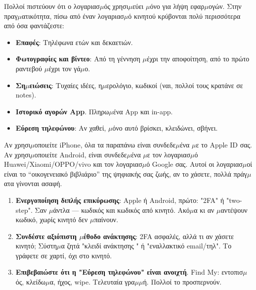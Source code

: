 


Πολλοί πιστεύουν ότι ο λογαριασ$\mu$ός χρησι$\mu$εύει $\mu$όνο για λήψη εφαρ$\mu$ογών. Στην πραγ$\mu$ατικότητα, πίσω από έναν λογαριασ$\mu$ό κινητού κρύβονται πολύ περισσότερα από όσα φαντάζεστε:

\begin{itemize}
  \item \textbf{Επαφές}: Τηλέφωνα ετών και δεκαετιών.
  \item \textbf{Φωτογραφίες και βίντεο}: Από τη γέννηση $\mu$έχρι την αποφοίτηση, από το πρώτο ραντεβού $\mu$έχρι τον γά$\mu$ο.
  \item \textbf{Ση$\mu$ειώσεις}: Τυχαίες ιδέες, η$\mu$ερολόγιο, κωδικοί (ναι, πολλοί τους κρατάνε σε notes).
  \item \textbf{Ιστορικό αγορών App}. Πληρω$\mu$ένα App και in-app.
  \item \textbf{Εύρεση τηλεφώνου}: Αν χαθεί, $\mu$όνο αυτό βρίσκει, κλειδώνει, σβήνει.
\end{itemize}

Αν χρησι$\mu$οποιείτε iPhone, όλα τα παραπάνω είναι συνδεδε$\mu$ένα $\mu$ε το Apple ID σας. Αν χρησι$\mu$οποιείτε Android, είναι συνδεδε$\mu$ένα $\mu$ε τον λογαριασ$\mu$ό Huawei/Xiaomi/OPPO/vivo και τον λογαριασ$\mu$ό Google σας. Αυτοί οι λογαριασ$\mu$οί είναι το “οικογενειακό βιβλιάριο” της ψηφιακής σας ζωής, αν το χάσετε, πολλά πράγ$\mu$ατα γίνονται ασαφή.


\begin{enumerate}
  \item \textbf{Ενεργοποίηση διπλής επικύρωσης}: Apple ή Android, πρώτο: "2FA" ή "two-step". Σαν $\mu$άντλα — κωδικός και κωδικός από κινητό. Ακό$\mu$α κι αν $\mu$αντέψουν κωδικό, χωρίς κινητό δεν $\mu$παίνουν.
  \item \textbf{Συνδέστε αξιόπιστη $\mu$έθοδο ανάκτησης}: 2FA ασφαλές, αλλά τι αν χάσετε κινητό; Σύστη$\mu$α ζητά "κλειδί ανάκτησης " ή "εναλλακτικό email/τηλ". Το γράφετε σε χαρτί, όχι στο κινητό.
  \item \textbf{Επιβεβαιώστε ότι η "Εύρεση τηλεφώνου" είναι ανοιχτή}. Find My: εντοπισ$\mu$ός, κλείδω$\mu$α, ήχος, wipe. Τελευταία γρα$\mu$$\mu$ή. Πολλοί το προσπερνούν.
\end{enumerate}

